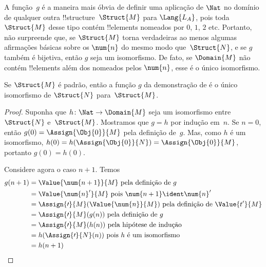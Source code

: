 \documentclass[../../../include/open-logic-section]{subfiles}
\begin{document}
\begin{explain}
A função~$g$ é a maneira mais óbvia de definir uma aplicação de
$\Nat$ no domínio de qualquer outra !!{structure}~$\Struct{M}$ para
$\Lang{L_A}$, pois toda $\Struct{M}$ desse tipo contém !!{element}s
nomeados por $\num{0}$, $\num{1}$, $\num{2}$ etc. Portanto, não
surpreende que, se $\Struct{M}$ torna verdadeiras ao menos algumas
afirmações básicas sobre os $\num{n}$ do mesmo modo que~$\Struct{N}$,
e se $g$ também é bijetiva, então $g$ seja um isomorfismo. De fato, se
$\Domain{M}$ não contém !!{element}s além dos nomeados pelos
$\num{n}$, esse é o único isomorfismo.
\end{explain}

\begin{prop}
 Se $\Struct{M}$ é padrão, então a função
$g$ da demonstração de  é o único isomorfismo
de $\Struct{N}$ para~$\Struct{M}$.
\end{prop}

\begin{proof}
Suponha que $h\colon \Nat \to \Domain{M}$ seja um isomorfismo entre
$\Struct{N}$ e~$\Struct{M}$. Mostramos que $g = h$ por indução
em~$n$. Se $n = 0$, então $g(0) = \Assign{\Obj{0}}{M}$ pela definição
de~$g$. Mas, como $h$ é um isomorfismo, $h(0) =
h(\Assign{\Obj{0}}{N}) =\Assign{\Obj{0}}{M}$, portanto $g(0) = h(0)$.

Considere agora o caso $n+1$. Temos
\begin{align*}
  g(n+1) & = \Value{\num{n+1}}{M} \text{ pela definição de~$g$}\\
  & = \Value{\num{n}'}{M} \text{ pois $\num{n+1}\ident \num{n}'$}\\
  & = \Assign{\prime}{M}(\Value{\num{n}}{M}) 
    \text{ pela definição de $\Value{t'}{M}$}\\
  & = \Assign{\prime}{M}(g(n))  \text{ pela definição de~$g$}\\
  & = \Assign{\prime}{M}(h(n)) \text{ pela hipótese de indução}\\
  & = h(\Assign{\prime}{N}(n)) \text{ pois $h$ é um isomorfismo}\\
  & = h(n+1)
\end{align*}
\end{proof}
\end{document}
